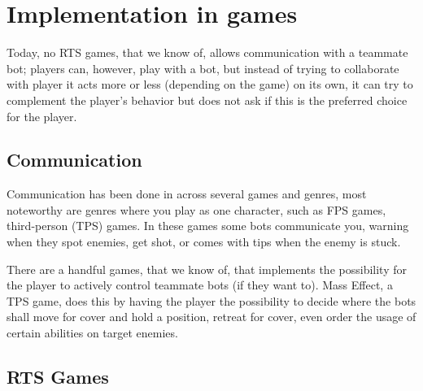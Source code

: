 \section{Implementation in games}

Today, no RTS games, that we know of, allows communication with a teammate bot; players can, however, play with a bot, but instead of trying to collaborate with player it acts more or less (depending on the game) on its own, it can try to complement the player's behavior but does not ask if this is the preferred choice for the player.

\subsection{Communication}
\label{sec:games_communication}
Communication has been done in across several games and genres, most noteworthy are genres where you play as one character, such as FPS games, third-person (TPS) games. In these games some bots communicate you, warning when they spot enemies, get shot, or comes with tips when the enemy is stuck. 

There are a handful games, that we know of, that implements the possibility for the player to actively control teammate bots (if they want to). Mass Effect\cite{masseffect}, a TPS game, does this by having the player the possibility to decide where the bots shall move for cover and hold a position, retreat for cover, even order the usage of certain abilities on target enemies.

\subsection{RTS Games}
